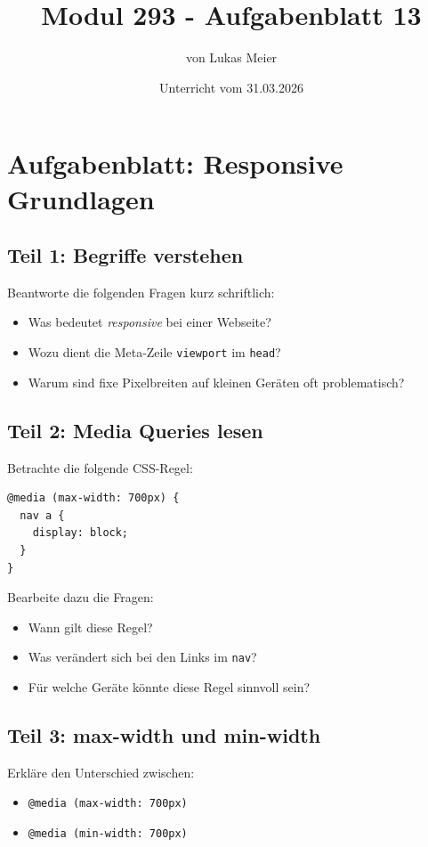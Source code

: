 \documentclass[a4paper,12pt]{article}
\title{Modul 293 - Aufgabenblatt 13}
\author{von Lukas Meier}
\date{Unterricht vom 31.03.2026}
\begin{document}
\maketitle

\section*{Aufgabenblatt: Responsive Grundlagen}

\subsection*{Teil 1: Begriffe verstehen}
Beantworte die folgenden Fragen kurz schriftlich:
\begin{itemize}
  \item Was bedeutet \emph{responsive} bei einer Webseite?
  \item Wozu dient die Meta-Zeile \texttt{viewport} im \texttt{head}?
  \item Warum sind fixe Pixelbreiten auf kleinen Geräten oft problematisch?
\end{itemize}

\subsection*{Teil 2: Media Queries lesen}
Betrachte die folgende CSS-Regel:

\begin{verbatim}
@media (max-width: 700px) {
  nav a {
    display: block;
  }
}
\end{verbatim}

Bearbeite dazu die Fragen:
\begin{itemize}
  \item Wann gilt diese Regel?
  \item Was verändert sich bei den Links im \texttt{nav}?
  \item Für welche Geräte könnte diese Regel sinnvoll sein?
\end{itemize}

\subsection*{Teil 3: max-width und min-width}
Erkläre den Unterschied zwischen:
\begin{itemize}
  \item \texttt{@media (max-width: 700px)}
  \item \texttt{@media (min-width: 700px)}
\end{itemize}
\end{document}
